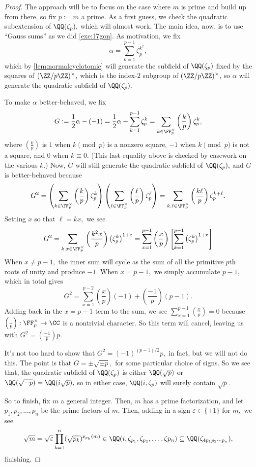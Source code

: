 \documentclass[../notes.tex]{subfiles}
\begin{document}
\begin{proof}
	The approach will be to focus on the case where $m$ is prime and build up from there, so fix $p:=m$ a prime. As a first guess, we check the quadratic subextension of $\QQ(\zeta_p),$ which will almost work. The main idea, now, is to use ``Gauss sums'' as we did \autoref{exe:17gon}. As motivation, we fix
	\[\alpha=\sum_{k=1}^{p-1}\zeta_p^{k^2},\]
	which by \autoref{lem:normalcyclotomic} will generate the subfield of $\QQ(\zeta_p)$ fixed by the squares of $(\ZZ/p\ZZ)^\times,$ which is the index-$2$ subgroup of $(\ZZ/p\ZZ)^\times,$ so $\alpha$ will generate the quadratic subfield of $\QQ(\zeta_p).$
	
	To make $\alpha$ better-behaved, we fix
	\[G:=\frac12\alpha-(-1)=\frac12\alpha-\sum_{k=1}^{p-1}\zeta_p^k=\sum_{k\in\FF_p^\times}\left(\frac kp\right)\zeta_p^k,\]
	where $\left(\frac kp\right)$ is $1$ when $k\pmod p$ is a nonzero square, $-1$ when $k\pmod p$ is not a square, and $0$ when $k\equiv0.$ (This last equality above is checked by casework on the various $k.$) Now, $G$ will still generate the quadratic subfield of $\QQ(\zeta_p),$ and $G$ is better-behaved because
	\[G^2=\left(\sum_{k\in\FF_p^\times}\left(\frac kp\right)\zeta_p^k\right)\left(\sum_{\ell\in\FF_p^\times}\left(\frac\ell p\right)\zeta_p^\ell\right)=\sum_{k,\ell\in\FF_p^\times}\left(\frac{k\ell}p\right)\zeta_p^{k+\ell}.\]
	Setting $x$ so that $\ell=kx,$ we see
	\[G^2=\sum_{k,x\in\FF_p^\times}\left(\frac{k^2x}p\right)\left(\zeta_p^k\right)^{1+x}=\sum_{x=1}^{p-1}\left(\frac xp\right)\left[\sum_{k=1}^{p-1}\left(\zeta_p^k\right)^{1+x}\right]\]
	When $x\ne p-1,$ the inner sum will cycle as the sum of all the primitive $p$th roots of unity and produce $-1.$ When $x=p-1,$ we simply accumulate $p-1,$ which in total gives
	\[G^2=\sum_{x=1}^{p-2}\left(\frac xp\right)(-1)+\left(\frac{-1}p\right)(p-1).\]
	Adding back in the $x=p-1$ term to the sum, we see $\sum_{x=1}^{p-1}\left(\frac xp\right)=0$ because $\left(\frac{\cdot}p\right):\FF_p^\times\to\CC$ is a nontrivial character. So this term will cancel, leaving us with $G^2=\left(\frac{-1}p\right)p.$

	It's not too hard to show that $G^2=(-1)^{(p-1)/2}p,$ in fact, but we will not do this. The point is that $G=\pm\sqrt{\pm p},$ for some particular choice of signs. So we see that, the quadratic subfield of $\QQ(\zeta_p)$ is either $\QQ(\sqrt p)$ or $\QQ(\sqrt{-p})=\QQ(i\sqrt p),$ so in either case, $\QQ(i,\zeta_p)$ will surely contain $\sqrt p.$

	So to finish, fix $m$ a general integer. Then, $m$ has a prime factorization, and let $p_1,p_2,\ldots,p_n$ be the prime factors of $m.$ Then, adding in a sign $\varepsilon\in\{\pm1\}$ for $m,$ we see
	\[\sqrt m=\sqrt\varepsilon\prod_{k=1}^n(\sqrt{p_k})^{\nu_{p_k}(m)}\in\QQ(i,\zeta_{p_1},\zeta_{p_2},\ldots,\zeta{p_n})\subseteq\QQ(\zeta_{4p_1p_2\cdots p_n}),\]
	finishing.
\end{proof}
\end{document}
